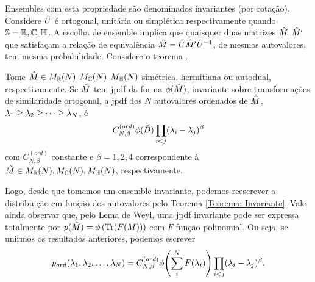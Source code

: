 Ensembles com esta propriedade são denominados invariantes (por rotação). Considere $\hat U$ é ortogonal, unitária ou simplética respectivamente quando $\mathbb{S} = \mathbb{R},\mathbb{C},\mathbb{H} $. A escolha de ensemble implica que quaisquer duas matrizes $\hat M, \hat M'$ que satisfaçam a relação de equivalência $\hat M = \hat U \hat M' \hat U^{-1}$, de mesmos autovalores, tem mesma probabilidade. Considere o teorema \cite[Capítulo~3]{AlanThesis}.
\begin{thm}
	Tome $\hat M \in M_{\mathbb{R}}(N),  M_{\mathbb{C}}(N),  M_{\mathbb{H}}(N)$ simétrica, hermitiana ou autodual, respectivamente. Se  $\hat M$ tem jpdf da forma $\phi(\hat M)$, invariante sobre transformações de similaridade ortogonal, a jpdf dos $N$ autovalores ordenados de $\hat M$, $\lambda_1 \geq \lambda_2 \geq \dots \geq \lambda_N$, é $$ C_{N, \beta}^{(ord)} \phi(\hat D) \prod_{i < j} (\lambda_i - \lambda_j)^{\beta}$$ com $C_{N, \beta}^{(ord)}$ constante e $\beta = 1, 2, 4$ correspondente à $\hat M \in M_{\mathbb{R}}(N),  M_{\mathbb{C}}(N),  M_{\mathbb{H}}(N)$, respectivamente. 
	\label{Teorema: Invariante}
\end{thm}
Logo, desde que tomemos um ensemble invariante, podemos reescrever a distribuição em função dos autovalores pelo Teorema \ref{Teorema: Invariante}. Vale ainda observar que, pelo Lema de Weyl, uma jpdf invariante pode ser expressa totalmente por $p(\hat M)= \phi \left(\Tr(F(M)) \right)$ com $F$ função polinomial. Ou seja, se unirmos os resultados anteriores, podemos escrever
\begin{equation}
	p_{ord}(\lambda_1, \lambda_2, \dots, \lambda_N) = C_{N, \beta}^{(ord)} \phi{\left( \sum_i^N F(\lambda_i) \right)} \prod_{i < j} (\lambda_i - \lambda_j)^{\beta}.
	\label{Equation: p-ord}
\end{equation}


